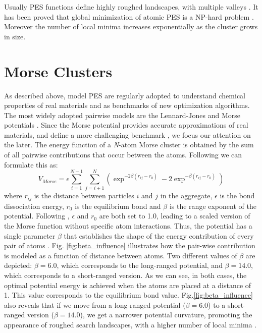 Usually PES functions define highly roughed landscapes, with multiple valleys \cite{stillinger99}. It has been proved that global minimization of atomic PES is a NP-hard problem \cite{doye98, wille85}. Moreover the number of local minima increases exponentially as the cluster grows in size.




	\section{Morse Clusters}
	\label{sec:morse_clusters}
	
	As described above, model PES are regularly adopted to understand chemical properties of real materials and as benchmarks of new optimization algorithms. The most widely adopted pairwise models are the Lennard-Jones \cite{lennardJones31} and Morse potentials \cite{morse29}. Since the Morse potential provides accurate approximations of real materials, and define a more challenging benchmark \cite{braier90, smirnov99}, we focus our attention on the later.
	The energy function of a \emph{N}-atom Morse cluster is obtained by the sum of all pairwise contributions that occur between the atoms. Following \cite{doye97, morse29} we can formulate this as:
	\begin{equation} 
		\label{eq:morse_potential}
		V_{Morse} = \epsilon \sum_{i=1}^{N-1}\sum_{j=i+1}^{N} \left ( \exp^{-2\beta(r_{ij}-r_{0})} - 2\exp^{-\beta(r_{ij}-r_{0})} \right)
	\end{equation}
	\noindent where $r_{ij}$ is the distance between particles $i$ and $j$ in the aggregate, $\epsilon$ is the bond dissociation energy, $r_{0}$ is the equilibrium bond and $\beta$ is the range exponent of the potential. Following \cite{doye97}, $\epsilon$ and $r_{0}$ are both set to 1.0, leading to a scaled version of the Morse function without specific atom interactions. Thus, the potential has a single parameter $\beta$ that establishes the shape of the energy contribution of every pair of atoms \cite{doye04}. Fig. \ref{fig:beta_influence} illustrates how the pair-wise contribution is modeled as a function of distance between atoms. Two different values of $\beta$ are depicted: $\beta = 6.0$, which corresponds to the long-ranged potential, and $\beta = 14.0$, which corresponds to a short-ranged version. As we can see, in both cases, the optimal potential energy is achieved when the atoms are placed at a distance of 1. This value corresponds to the equilibrium bond value. Fig.\ref{fig:beta_influence} also reveals that if we move from a long-ranged potential ($\beta = 6.0$) to a short-ranged version ($\beta = 14.0$), we get a narrower potential curvature, promoting the appearance of roughed search landscapes, with a higher number of local minima \cite{doye04}.	
	
	
	
	
	
	
	
